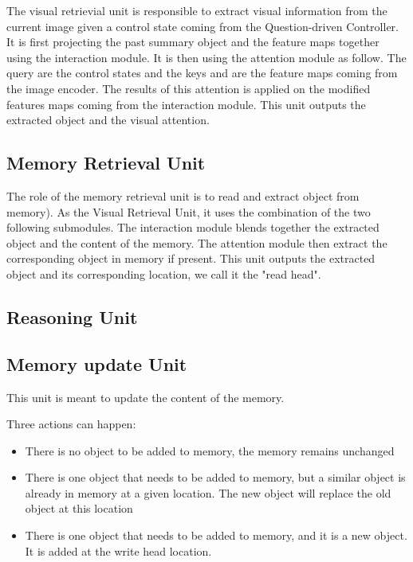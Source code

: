 The visual retrievial unit is responsible to extract visual information from the current image given a control state coming from the Question-driven Controller. It is first projecting the past summary object and the feature maps together using the interaction module.
It is then using the attention module as follow. The query are the control states and the keys and are the feature maps coming from the image encoder. The results of this attention is applied on the modified features maps coming from the interaction module.  
This unit outputs the extracted object and the visual attention.

\subsection{Memory Retrieval Unit}

The role of the memory retrieval unit is to read and extract object from memory).
As the Visual Retrieval Unit, it uses the combination of the two following submodules. The interaction module blends together the extracted object and the content of the memory. The attention module then extract the corresponding object in memory if present. This unit outputs the extracted object and its corresponding location, we call it the "read head".


\subsection{Reasoning Unit}


\subsection{Memory update Unit}

This unit is meant to update the content of the memory. 

Three actions can happen:

\begin{itemize}
	\item There is no object to be added to memory, the memory remains unchanged
	\item There is one object that needs to be added to memory, but a similar object is already in memory at a given location. The new object will replace the old object at this location
	
	\item There is one object that needs to be added to memory, and  it is a new object. It is added at the write head location.
\end{itemize}


